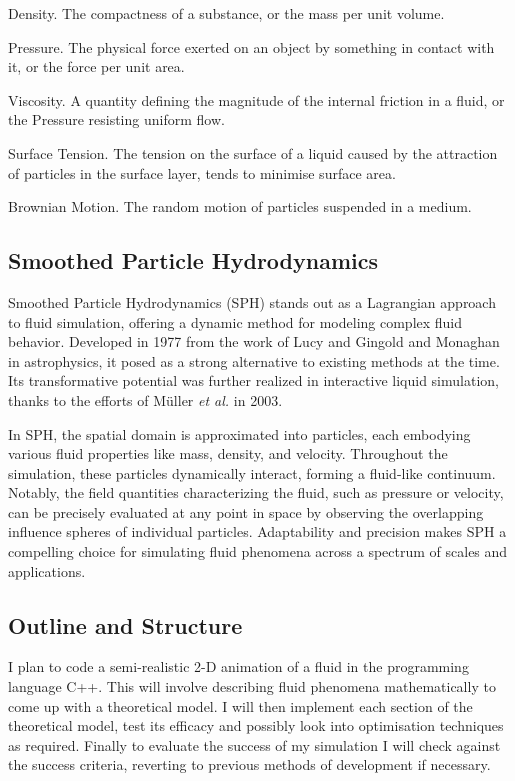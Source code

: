 \documentclass[write-up.tex]{subfiles}
\begin{document}
\begin{worddefs}
 \item[Density.] The compactness of a substance, or the mass per unit volume.
 \item[Pressure.] The physical force exerted on an object by something in contact with it, or the force per unit area.
 \item[Viscosity.] A quantity defining the magnitude of the internal friction in a fluid, or the Pressure resisting uniform flow.
 \item[Surface Tension.] The tension on the surface of a liquid caused by the attraction of particles in the surface layer, tends to minimise surface area.
 \item[Brownian Motion.] The random motion of particles suspended in a medium.
\end{worddefs}

\subsection{Smoothed Particle Hydrodynamics}
Smoothed Particle Hydrodynamics (SPH) stands out as a Lagrangian approach to fluid simulation, offering a dynamic method for modeling complex fluid behavior. Developed in 1977 from the work of Lucy \cite{lucy} and Gingold and Monaghan \cite{gingold} in astrophysics, it posed as a strong alternative to existing methods at the time. Its transformative potential was further realized in interactive liquid simulation, thanks to the efforts of Müller \textit{et al.} \cite{muller} in 2003.

In SPH, the spatial domain is approximated into particles, each embodying various fluid properties like mass, density, and velocity. Throughout the simulation, these particles dynamically interact, forming a fluid-like continuum. Notably, the field quantities characterizing the fluid, such as pressure or velocity, can be precisely evaluated at any point in space by observing the overlapping influence spheres of individual particles. Adaptability and precision makes SPH a compelling choice for simulating fluid phenomena across a spectrum of scales and applications.

\subsection{Outline and Structure}
I plan to code a semi-realistic 2-D animation of a fluid in the programming language C++. This will involve describing fluid phenomena mathematically to come up with a theoretical model. I will then implement each section of the theoretical model, test its efficacy and possibly look into optimisation techniques as required. Finally to evaluate the success of my simulation I will check against the success criteria, reverting to previous methods of development if necessary.
\end{document}
